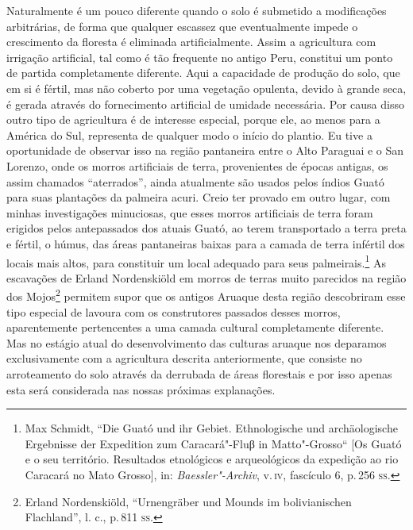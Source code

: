 Naturalmente é um pouco diferente quando o solo é submetido a
modificações arbitrárias, de forma que qualquer escassez que
eventualmente impede o crescimento da floresta é eliminada
artificialmente. Assim a agricultura com irrigação artificial, tal como
é tão frequente no antigo Peru, constitui um ponto de partida
completamente diferente. Aqui a capacidade de produção do solo, que em
si é fértil, mas não coberto por uma vegetação opulenta, devido à grande
seca, é gerada através do fornecimento artificial de umidade necessária.
Por causa disso outro tipo de agricultura é de interesse especial,
porque ele, ao menos para a América do Sul, representa de qualquer modo
o início do plantio. Eu tive a oportunidade de observar isso na região
pantaneira entre o Alto Paraguai e o San Lorenzo, onde os morros
artificiais de terra, provenientes de épocas antigas, os assim chamados
``aterrados'', ainda atualmente são usados pelos índios Guató para suas
plantações da palmeira acuri. Creio ter provado em outro lugar, com
minhas investigações minuciosas, que esses morros artificiais de terra
foram erigidos pelos antepassados dos atuais Guató, ao terem
transportado a terra preta e fértil, o húmus, das áreas pantaneiras
baixas para a camada de terra infértil dos locais mais altos, para
constituir um local adequado para seus palmeirais.\footnote{Max Schmidt,
  ``Die Guató und ihr Gebiet. Ethnologische und archäologische
  Ergebnisse der Expedition zum Caracará"-Fluβ in Matto"-Grosso`` {[}Os
  Guató e o seu território. Resultados etnológicos e arqueológicos da
  expedição ao rio Caracará no Mato Grosso{]}, in:
  \textit{Baessler"-Archiv}, v.\,\textsc{iv}, fascículo 6, p.\,256 \textsc{ss}.} As escavações
de Erland Nordenskiöld em morros de terras muito parecidos na região dos
Mojos\footnote{Erland Nordenskiöld, ``Urnengräber und Mounds im
  bolivianischen Flachland'', l. c., p.\,811 \textsc{ss}.} permitem supor que os
antigos Aruaque desta região descobriram esse tipo especial de lavoura
com os construtores passados desses morros, aparentemente pertencentes
a uma camada cultural completamente diferente. Mas no estágio atual do
desenvolvimento das culturas aruaque nos deparamos exclusivamente com a
agricultura descrita anteriormente, que consiste no arroteamento do solo
através da derrubada de áreas florestais e por isso apenas esta será
considerada nas nossas próximas explanações.

